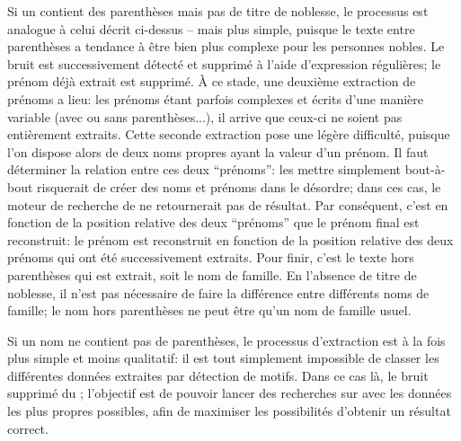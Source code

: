 Si un \tname{} contient des parenthèses mais pas de titre de noblesse, le processus est analogue à celui décrit ci-dessus -- mais plus simple, puisque le texte entre parenthèses a tendance à être bien plus complexe pour les personnes nobles. Le bruit est successivement détecté et supprimé à l'aide d'\glspl{expression régulière}; le prénom déjà extrait est supprimé. À ce stade, une deuxième extraction de prénoms a lieu: les prénoms étant parfois complexes et écrits d'une manière variable (avec ou sans parenthèses...), il arrive que ceux-ci ne soient pas entièrement extraits. Cette seconde extraction pose une légère difficulté, puisque l'on dispose alors de deux noms propres ayant la valeur d'un prénom. Il faut déterminer la relation entre ces deux \enquote{prénoms}: les mettre simplement bout-à-bout risquerait de créer des noms et prénoms dans le désordre; dans ces cas, le moteur de recherche de \wkd{} ne retournerait pas de résultat. Par conséquent, c'est en fonction de la position relative des deux \enquote{prénoms} que le prénom final est reconstruit: le prénom est reconstruit en fonction de la position relative des deux prénoms qui ont été successivement extraits. Pour finir, c'est le texte hors parenthèses qui est extrait, soit le nom de famille. En l'absence de titre de noblesse, il n'est pas nécessaire de faire la différence entre différents noms de famille; le nom hors parenthèses ne peut être qu'un nom de famille usuel.

Si un nom ne contient pas de parenthèses, le processus d'extraction est à la fois plus simple et moins qualitatif: il est tout simplement impossible de classer les différentes données extraites par détection de motifs. Dans ce cas là, le bruit supprimé du \tname{}; l'objectif est de pouvoir lancer des recherches sur \wkd{} avec les données les plus propres possibles, afin de maximiser les possibilités d'obtenir un résultat correct.

